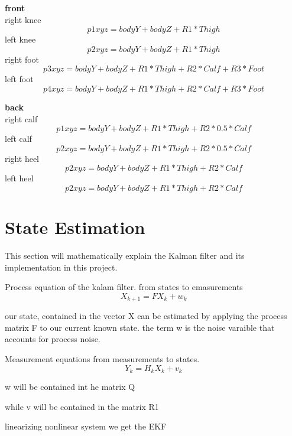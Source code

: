 \textbf{front}\\
right knee
$$ p1xyz = bodyY + bodyZ + R1 * Thigh $$
left knee
$$ p2xyz = bodyY + bodyZ + R1 * Thigh $$
right foot
$$ p3xyz = bodyY + bodyZ + R1 * Thigh + R2 * Calf + R3 * Foot $$
left foot
$$ p4xyz = bodyY + bodyZ + R1 * Thigh + R2 * Calf + R3 * Foot $$

\textbf{back}\\
right calf
$$ p1xyz = bodyY + bodyZ + R1 * Thigh + R2 * 0.5 * Calf $$
left calf
$$ p2xyz = bodyY + bodyZ + R1 * Thigh + R2 * 0.5 * Calf $$
right heel
$$ p2xyz = bodyY + bodyZ + R1 * Thigh + R2 * Calf $$
left heel
$$ p2xyz = bodyY + bodyZ + R1 * Thigh + R2 * Calf $$





\section{State Estimation}
This section will mathematically explain the Kalman filter and its implementation in this project.

Process equation of the kalam filter.
from states to emasurements
$$ X_{k+1} = FX_{k} + w_{k}  $$

our state, contained in the vector X can be estimated by applying the process matrix F to our current known state. the term w is the noise varaible that accounts for process noise.

Measurement equations
from measurements to states.
$$ Y_k = H_{k}X_{k} + v_{k} $$

w will be contained int he matrix Q

while v will be contained in the matrix R1


linearizing nonlinear system we get the EKF










